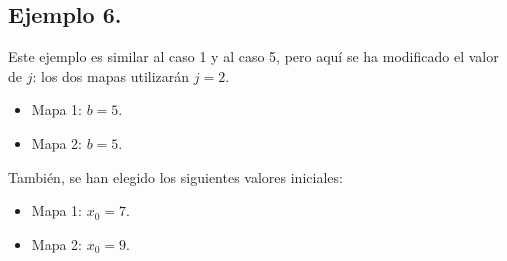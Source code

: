 \documentclass[10pt]{IEEEtran}
\begin{document}
\subsection{Ejemplo 6.}
Este ejemplo es similar al caso 1 y al caso 5, pero aquí se ha modificado el valor de $j$: los dos mapas utilizarán $j=2$. 

\begin{itemize}
\item Mapa 1: $b =  5$.
\item Mapa 2: $b =  5$.
\end{itemize}

También, se han elegido los siguientes valores iniciales:

\begin{itemize}
\item Mapa 1: $x_{0} = 7$.
\item Mapa 2: $x_{0} = 9$.
\end{itemize}
\end{document}
